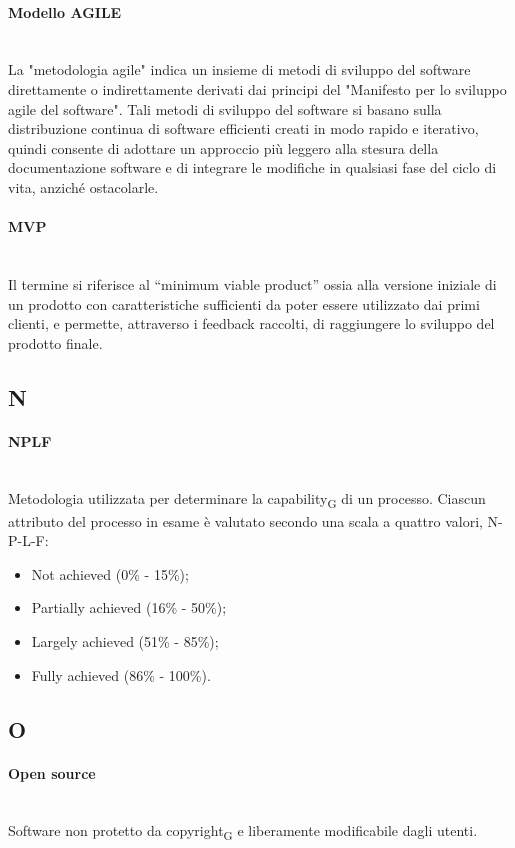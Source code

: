 \paragraph{Modello AGILE}~\smallskip \\
La "metodologia agile" indica un insieme di metodi di sviluppo del software direttamente o indirettamente derivati dai principi del "Manifesto per lo sviluppo agile del software".
Tali metodi di sviluppo del software si basano sulla distribuzione continua di software efficienti creati in modo rapido e iterativo, quindi
consente di adottare un approccio più leggero alla stesura della documentazione software e di integrare le modifiche in qualsiasi fase del ciclo di vita, anziché ostacolarle.

\paragraph{MVP}~\smallskip \\
Il termine si riferisce al “minimum viable product” ossia alla versione iniziale di un prodotto con 
caratteristiche sufficienti da poter essere utilizzato dai primi clienti, e permette, attraverso i feedback raccolti, di raggiungere lo sviluppo del prodotto finale.
\newpage
{}
\subsection*{N}
\paragraph{NPLF}~\smallskip \\
Metodologia utilizzata per determinare la capability\textsubscript{G} di un processo. Ciascun attributo del processo in esame è valutato secondo una scala a quattro valori, N-P-L-F:
\begin{itemize}
	\item Not achieved (0\% - 15\%);
	\item Partially achieved (16\% - 50\%);
	\item Largely achieved (51\% - 85\%);
    \item Fully achieved (86\% - 100\%).
\end{itemize}
\newpage
{}
\subsection*{O}
\paragraph{Open source}~\smallskip \\
Software non protetto da copyright\textsubscript{G} e liberamente modificabile dagli utenti.
\newpage
{}
